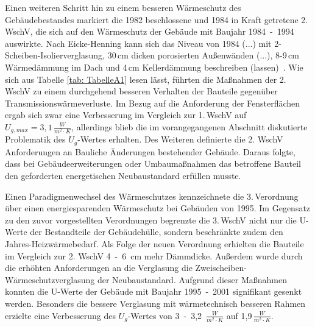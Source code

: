 Einen weiteren Schritt hin zu einem besseren Wärmeschutz des Gebäudebestandes markiert die 1982 beschlossene und 1984 in Kraft getretene 2. WschV, die sich auf den Wärmeschutz der Gebäude mit Baujahr \mbox{1984 - 1994} auswirkte.
Nach Eicke-Henning kann sich \glqq das Niveau von 1984 (...) mit 2-Scheiben-Isolierverglasung, 30\,cm dicken porosierten Außenwänden (...), 8-9\,cm Wärmedämmung im Dach und 4\,cm Kellerdämmung beschreiben (lassen) \grqq\,\cite{EickeHenning.2011}.
Wie sich aus Tabelle \ref{tab: TabelleA1} lesen lässt, führten die Maßnahmen der 2.\,WschV zu einem durchgehend besseren Verhalten der Bauteile gegenüber Transmissionswärmeverluste. 
Im Bezug auf die Anforderung der Fensterflächen ergab sich zwar eine Verbesserung im Vergleich zur 1.\,WschV auf \(U_{g, max} = 3,1\,\frac{W}{m^2 \cdot K} \), allerdings blieb die im vorangegangenen Abschnitt diskutierte Problematik des \(U_g\)-Wertes erhalten.
Des Weiteren definierte die 2. WschV Anforderungen an \glqq Bauliche Änderungen bestehender Gebäude\grqq.
Daraus folgte, dass bei Gebäudeerweiterungen oder Umbaumaßnahmen das betroffene Bauteil den geforderten energetischen Neubaustandard erfüllen musste.

Einen Paradigmenwechsel des Wärmeschutzes kennzeichnete die 3.\,Verordnung über einen energiesparenden Wärmeschutz bei Gebäuden von 1995.
Im Gegensatz zu den zuvor vorgestellten Verordnungen begrenzte die 3.\,WschV nicht nur die U-Werte der Bestandteile der Gebäudehülle, sondern beschränkte zudem den Jahres-Heizwärmebedarf.
Als Folge der neuen Verordnung erhielten die Bauteile im Vergleich zur 2. WschV \mbox{4 - 6 cm} mehr Dämmdicke. 
Außerdem wurde durch die erhöhten Anforderungen an die Verglasung die Zweischeiben-Wärmeschutzverglasung der Neubaustandard.
Aufgrund dieser Maßnahmen konnten die U-Werte der Gebäude mit Baujahr \mbox{1995 - 2001} signifikant gesenkt werden.
Besonders die bessere Verglasung mit wärmetechnisch besseren Rahmen erzielte eine Verbesserung des \(U_g\)-Wertes von \mbox{3 - 3,2 \(\frac{W}{m^2 \cdot K} \)} auf 1,9\,\(\frac{W}{m^2 \cdot K} \).

